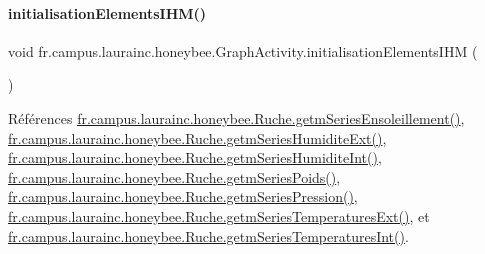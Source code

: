 \paragraph{\texorpdfstring{initialisation\+Elements\+I\+H\+M()}{initialisationElementsIHM()}}
{\footnotesize\ttfamily void fr.\+campus.\+laurainc.\+honeybee.\+Graph\+Activity.\+initialisation\+Elements\+I\+HM (\begin{DoxyParamCaption}{ }\end{DoxyParamCaption})\hspace{0.3cm}{\ttfamily [private]}}



Références \hyperlink{classfr_1_1campus_1_1laurainc_1_1honeybee_1_1_ruche_afb6dfa76b8c8c35151face6a5fe32044}{fr.\+campus.\+laurainc.\+honeybee.\+Ruche.\+getm\+Series\+Ensoleillement()}, \hyperlink{classfr_1_1campus_1_1laurainc_1_1honeybee_1_1_ruche_ad1868fa7a9c8f7840e224b06eb03dac9}{fr.\+campus.\+laurainc.\+honeybee.\+Ruche.\+getm\+Series\+Humidite\+Ext()}, \hyperlink{classfr_1_1campus_1_1laurainc_1_1honeybee_1_1_ruche_a2b57090da3912989bbfcc04a76f9e651}{fr.\+campus.\+laurainc.\+honeybee.\+Ruche.\+getm\+Series\+Humidite\+Int()}, \hyperlink{classfr_1_1campus_1_1laurainc_1_1honeybee_1_1_ruche_aebd7c24cbb596731671db1a9554c8351}{fr.\+campus.\+laurainc.\+honeybee.\+Ruche.\+getm\+Series\+Poids()}, \hyperlink{classfr_1_1campus_1_1laurainc_1_1honeybee_1_1_ruche_a237f9b18ebb70839382bc2bfc237b5da}{fr.\+campus.\+laurainc.\+honeybee.\+Ruche.\+getm\+Series\+Pression()}, \hyperlink{classfr_1_1campus_1_1laurainc_1_1honeybee_1_1_ruche_ace771aab9a10f7cf13050197a85c41f7}{fr.\+campus.\+laurainc.\+honeybee.\+Ruche.\+getm\+Series\+Temperatures\+Ext()}, et \hyperlink{classfr_1_1campus_1_1laurainc_1_1honeybee_1_1_ruche_ae3f7d6c16444905061f13fe14eb21d69}{fr.\+campus.\+laurainc.\+honeybee.\+Ruche.\+getm\+Series\+Temperatures\+Int()}.


